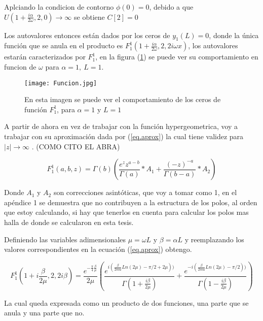 Aplciando la condicion de contorno $\phi (0) = 0$, debido a que $U (1+\frac{i \alpha}{2 \omega},2,0) \rightarrow \infty $ se obtiene $C[2]=0$


Los autovalores entonces están dados por los ceros de $y _1 (L) = 0 $, donde la única función que se anula en el producto es  $F _1 ^1 (1+\frac{i \alpha}{2 \omega},2,2 i \omega x) $, los autovalores estarán caracterizados por  $F _1 ^1$, en la figura (\ref{fig:funcion}) se puede ver su comportamiento en funcion de $\omega$ para  $\alpha=1, \ L=1$.

\begin{figure}
\centering
\texttt{[image: Funcion.jpg]}
\caption{En esta imagen se puede ver el comportamiento de los ceros de función $F _1 ^1$, para $\alpha=1$ y $L=1$}
\label{fig:funcion}
\end{figure}

A partir de ahora en vez de trabajar con la función hypergeometrica, voy a trabajar con su aproximación dada por (\ref{eq.aprox}) la cual tiene validez para $|z| \rightarrow \infty$ . (COMO CITO EL ABRA)

\begin{equation}
    F _1 ^1 (a,b,z) = \Gamma (b) 
    \left(
    \frac{e^z z ^{a-b} }{\Gamma(a)} * A_1 + \frac{(-z) ^{ -a}}{ \Gamma(b-a)} 
    * A_2
    \right)
\label{eq.aprox}
\end{equation}

Donde $A_1$ y $A_2$ son correcciones asintóticas, que voy a tomar como 1, en el apéndice 1 se demuestra que no contribuyen a la estructura de los polos, al orden que estoy calculando, si hay que tenerlos en cuenta para calcular los polos mas halla de donde se calcularon en esta tesis.

Definiendo las variables adimensionales $\mu = \omega L$  y $\beta = \alpha L $ y reemplazando los valores correspondientes en la ecuación (\ref{eq.aprox}) obtengo. 

\begin{equation}
    F _1 ^1 (1+ i \frac{  \beta}{2 \mu} ,2 ,2 i \beta ) = 
    \frac{e ^{- \frac{\pi}{4} \frac{\beta}{\mu} } }{2 \mu}
    \left(
    \frac{e ^{i (\frac{\beta}{2 mu} Ln(2 \mu) - \pi/2+ 2 \mu))}}{\Gamma(1+\frac{i \beta}{2 \mu})} + 
    \frac{e ^{- i (\frac{\beta}{2 mu} Ln(2 \mu) - \pi/2 ))}}{\Gamma(1-\frac{i \beta}{2 \mu})}
    \right)
\label{eq.completa}
\end{equation}




La cual queda expresada como un producto de dos funciones, una parte que se anula y una parte que no.

